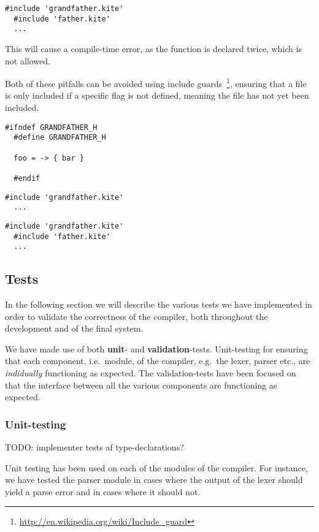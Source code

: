 \begin{lstlisting}[caption=\code{child.kite}]
  #include 'grandfather.kite'
  #include 'father.kite'
  ...
\end{lstlisting}

This will cause a compile-time error, as the  function is
declared twice, which is not allowed.

Both of these pitfalls can be avoided using include
guards~\footnote{\url{http://en.wikipedia.org/wiki/Include_guard}},
ensuring that a file is only included if a specific flag is not
defined, meaning the file has not yet been included.

\begin{lstlisting}[caption=\code{grandfather.kite}]
  #ifndef GRANDFATHER_H
  #define GRANDFATHER_H

  foo = -> { bar }

  #endif
\end{lstlisting}

\begin{lstlisting}[caption=\code{father.kite}]
  #include 'grandfather.kite'
  ...
\end{lstlisting}

\begin{lstlisting}[caption=\code{child.kite}]
  #include 'grandfather.kite'
  #include 'father.kite'
  ...
\end{lstlisting}


\subsection{Tests}
In the following section we will describe the various tests we have implemented in order to validate the correctness of the compiler, both throughout the development and of the final system.

We have made use of both \textbf{unit}- and \textbf{validation}-tests. Unit-testing for ensuring that each component, i.e.\ module, of the compiler, e.g.\ the lexer, parser etc., are \emph{indidually} functioning as expected. The validation-tests have been focused on that the interface between all the various components are functioning as expected.

\subsubsection{Unit-testing}  TODO: implementer tests af type-declarations?

Unit testing has been used on each of the modules of the
compiler. For instance, we have tested the parser module in cases
where the output of the lexer should yield a parse error and in cases
where it should not.

